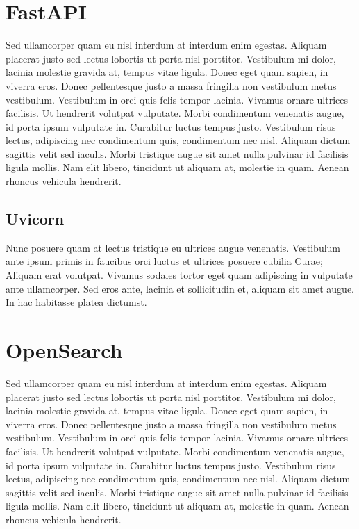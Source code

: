 \section{FastAPI}

Sed ullamcorper quam eu nisl interdum at interdum enim egestas. Aliquam placerat justo sed lectus lobortis ut porta nisl porttitor. Vestibulum mi dolor, lacinia molestie gravida at, tempus vitae ligula. Donec eget quam sapien, in viverra eros. Donec pellentesque justo a massa fringilla non vestibulum metus vestibulum. Vestibulum in orci quis felis tempor lacinia. Vivamus ornare ultrices facilisis. Ut hendrerit volutpat vulputate. Morbi condimentum venenatis augue, id porta ipsum vulputate in. Curabitur luctus tempus justo. Vestibulum risus lectus, adipiscing nec condimentum quis, condimentum nec nisl. Aliquam dictum sagittis velit sed iaculis. Morbi tristique augue sit amet nulla pulvinar id facilisis ligula mollis. Nam elit libero, tincidunt ut aliquam at, molestie in quam. Aenean rhoncus vehicula hendrerit.

\subsection{Uvicorn}

Nunc posuere quam at lectus tristique eu ultrices augue venenatis. Vestibulum ante ipsum primis in faucibus orci luctus et ultrices posuere cubilia Curae; Aliquam erat volutpat. Vivamus sodales tortor eget quam adipiscing in vulputate ante ullamcorper. Sed eros ante, lacinia et sollicitudin et, aliquam sit amet augue. In hac habitasse platea dictumst.


\section{OpenSearch}

Sed ullamcorper quam eu nisl interdum at interdum enim egestas. Aliquam placerat justo sed lectus lobortis ut porta nisl porttitor. Vestibulum mi dolor, lacinia molestie gravida at, tempus vitae ligula. Donec eget quam sapien, in viverra eros. Donec pellentesque justo a massa fringilla non vestibulum metus vestibulum. Vestibulum in orci quis felis tempor lacinia. Vivamus ornare ultrices facilisis. Ut hendrerit volutpat vulputate. Morbi condimentum venenatis augue, id porta ipsum vulputate in. Curabitur luctus tempus justo. Vestibulum risus lectus, adipiscing nec condimentum quis, condimentum nec nisl. Aliquam dictum sagittis velit sed iaculis. Morbi tristique augue sit amet nulla pulvinar id facilisis ligula mollis. Nam elit libero, tincidunt ut aliquam at, molestie in quam. Aenean rhoncus vehicula hendrerit.

